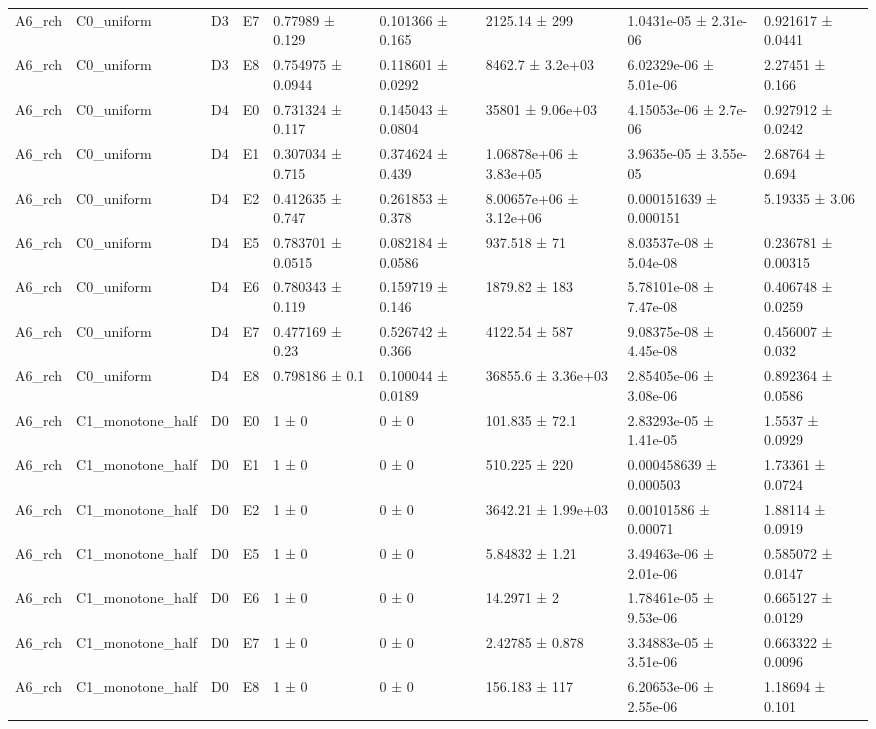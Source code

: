 \begin{table}
\begin{tabular}{lllllllll}
A6\_rch & C0\_uniform & D3 & E7 & 0.77989 ± 0.129 & 0.101366 ± 0.165 & 2125.14 ± 299 & 1.0431e-05 ± 2.31e-06 & 0.921617 ± 0.0441 \\
A6\_rch & C0\_uniform & D3 & E8 & 0.754975 ± 0.0944 & 0.118601 ± 0.0292 & 8462.7 ± 3.2e+03 & 6.02329e-06 ± 5.01e-06 & 2.27451 ± 0.166 \\
A6\_rch & C0\_uniform & D4 & E0 & 0.731324 ± 0.117 & 0.145043 ± 0.0804 & 35801 ± 9.06e+03 & 4.15053e-06 ± 2.7e-06 & 0.927912 ± 0.0242 \\
A6\_rch & C0\_uniform & D4 & E1 & 0.307034 ± 0.715 & 0.374624 ± 0.439 & 1.06878e+06 ± 3.83e+05 & 3.9635e-05 ± 3.55e-05 & 2.68764 ± 0.694 \\
A6\_rch & C0\_uniform & D4 & E2 & 0.412635 ± 0.747 & 0.261853 ± 0.378 & 8.00657e+06 ± 3.12e+06 & 0.000151639 ± 0.000151 & 5.19335 ± 3.06 \\
A6\_rch & C0\_uniform & D4 & E5 & 0.783701 ± 0.0515 & 0.082184 ± 0.0586 & 937.518 ± 71 & 8.03537e-08 ± 5.04e-08 & 0.236781 ± 0.00315 \\
A6\_rch & C0\_uniform & D4 & E6 & 0.780343 ± 0.119 & 0.159719 ± 0.146 & 1879.82 ± 183 & 5.78101e-08 ± 7.47e-08 & 0.406748 ± 0.0259 \\
A6\_rch & C0\_uniform & D4 & E7 & 0.477169 ± 0.23 & 0.526742 ± 0.366 & 4122.54 ± 587 & 9.08375e-08 ± 4.45e-08 & 0.456007 ± 0.032 \\
A6\_rch & C0\_uniform & D4 & E8 & 0.798186 ± 0.1 & 0.100044 ± 0.0189 & 36855.6 ± 3.36e+03 & 2.85405e-06 ± 3.08e-06 & 0.892364 ± 0.0586 \\
A6\_rch & C1\_monotone\_half & D0 & E0 & 1 ± 0 & 0 ± 0 & 101.835 ± 72.1 & 2.83293e-05 ± 1.41e-05 & 1.5537 ± 0.0929 \\
A6\_rch & C1\_monotone\_half & D0 & E1 & 1 ± 0 & 0 ± 0 & 510.225 ± 220 & 0.000458639 ± 0.000503 & 1.73361 ± 0.0724 \\
A6\_rch & C1\_monotone\_half & D0 & E2 & 1 ± 0 & 0 ± 0 & 3642.21 ± 1.99e+03 & 0.00101586 ± 0.00071 & 1.88114 ± 0.0919 \\
A6\_rch & C1\_monotone\_half & D0 & E5 & 1 ± 0 & 0 ± 0 & 5.84832 ± 1.21 & 3.49463e-06 ± 2.01e-06 & 0.585072 ± 0.0147 \\
A6\_rch & C1\_monotone\_half & D0 & E6 & 1 ± 0 & 0 ± 0 & 14.2971 ± 2 & 1.78461e-05 ± 9.53e-06 & 0.665127 ± 0.0129 \\
A6\_rch & C1\_monotone\_half & D0 & E7 & 1 ± 0 & 0 ± 0 & 2.42785 ± 0.878 & 3.34883e-05 ± 3.51e-06 & 0.663322 ± 0.0096 \\
A6\_rch & C1\_monotone\_half & D0 & E8 & 1 ± 0 & 0 ± 0 & 156.183 ± 117 & 6.20653e-06 ± 2.55e-06 & 1.18694 ± 0.101 \\

\end{tabular}
\end{table}
